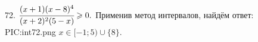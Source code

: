 72. $\cfrac{(x+1)(x-8)^4}{(x+2)^2(5-x)}\geqslant0.$ Применив метод интервалов, найдём ответ:
{{PIC:int72.png}}
$x\in[-1;5)\cup\{8\}.$\\
